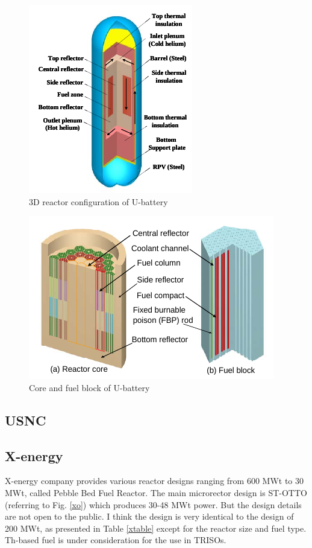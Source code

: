 \documentclass[10pt,a4paper]{article}
\begin{document}
\begin{figure}[htbp]
\centering
\includegraphics[scale=1]{Figs/ubattery3d.jpeg}
\caption{ 3D reactor configuration of U-battery}
\label{u3d}
\end{figure}

\begin{figure}[htbp]
\centering
\includegraphics[scale=1]{Figs/ubatterycore.jpeg}
\caption{ Core and fuel block of U-battery}
\label{ucore}
\end{figure}


\pagebreak
\subsection{USNC}


\pagebreak
\subsection{X-energy}
X-energy company provides various reactor designs ranging from 600 MWt to 30 MWt, called Pebble Bed Fuel Reactor. The main microrector design is ST-OTTO (referring to Fig.  \ref{xo}) which produces 30-48 MWt power. But the design details are not open to the public. I think the design is very identical to the design of 200 MWt, as presented in Table \ref{xtable} except for the reactor size and fuel type. Th-based fuel is under consideration for the use in TRISOs. 
\end{document}
